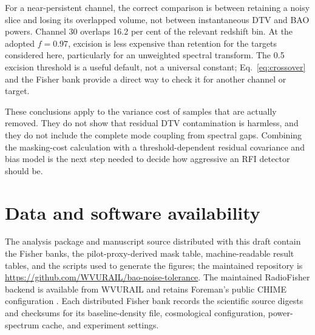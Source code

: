 For a near-persistent channel, the correct comparison is between
retaining a noisy slice and losing its overlapped volume, not between
instantaneous DTV and BAO powers. Channel 30 overlaps 16.2 per cent of
the relevant redshift bin. At the adopted $f=0.97$, excision is less
expensive than retention for the targets considered here, particularly
for an unweighted spectral transform. The 0.5 excision threshold is a
useful default, not a universal constant; Eq.~\eqref{eq:crossover} and
the Fisher bank provide a direct way to check it for another channel or
target.

These conclusions apply to the variance cost of samples that are
actually removed. They do not show that residual DTV contamination is
harmless, and they do not include the complete mode coupling from
spectral gaps. Combining the masking-cost calculation with a
threshold-dependent residual covariance and bias model is the next step
needed to decide how aggressive an RFI detector should be.

\section*{Data and software availability}

The analysis package and manuscript source distributed with this draft
contain the Fisher banks, the pilot-proxy-derived mask table,
machine-readable result tables, and the scripts used to generate the
figures; the maintained repository is
\url{https://github.com/WVURAIL/bao-noise-tolerance}. The maintained
RadioFisher backend is available from WVURAIL \citep{RadioFisherFork} and
retains Foreman's public CHIME configuration \citep{Foreman2021}. Each
distributed Fisher bank records the scientific source digests and checksums
for its baseline-density file, cosmological configuration, power-spectrum
cache, and experiment settings.
